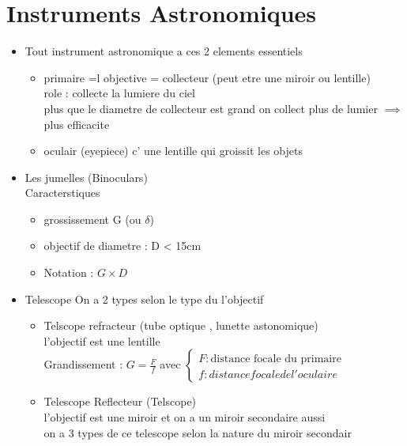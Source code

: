 \documentclass[12pt]{book}
\begin{document}
    \chapter{Instruments Astronomiques}
       \begin{itemize}
        \item  Tout instrument astronomique a ces 2 elements essentiels 
        \begin{itemize}
            \item primaire =l objective  = collecteur (peut etre une miroir ou lentille) \\
                role : collecte la lumiere du ciel \\
                plus que le diametre de collecteur est grand on collect plus de lumier $ \implies $ plus efficacite
            \item  oculair (eyepiece) c' une lentille qui groissit les objets  
        \end{itemize}
        \item Les jumelles (Binoculars) \\
            Caracterstiques \begin{itemize}
                \item grossissement G (ou $ \delta $)
                \item objectif de diametre : D < 15cm
                \item Notation : $ G\times D $
            \end{itemize}
        \item Telescope
            On a 2 types selon le type du l'objectif 
            \begin{itemize}
                \item Telscope refracteur (tube optique , lunette astonomique)\\
                    l'objectif est une lentille \\
                    Grandissement : $ G = \frac{F}{f} $ avec $ \begin{cases}
                        F : \text{distance focale du primaire} \\ f : distance focale de l'oculaire
                    \end{cases} $
                \item Telescope Reflecteur (Telscope) \\
                    l'objectif est une miroir et on a un miroir secondaire aussi \\
                    on a 3 types de ce telescope selon la nature du miroir secondair 

\end{itemize}
\end{itemize}
\end{document}
